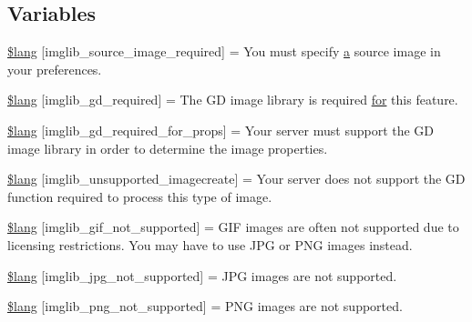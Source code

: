 \subsection*{Variables}
\begin{DoxyCompactItemize}
\item 
\hyperlink{system_2language_2english_2imglib__lang_8php_af48787ab142f633036ebdf1cc5da7409}{\$lang} \mbox{[}\textquotesingle{}imglib\+\_\+source\+\_\+image\+\_\+required\textquotesingle{}\mbox{]} = \textquotesingle{}You must specify \hyperlink{_admin_2assets_2js_2bootstrap_8min_8js_a1f5870dcf487187f13d5fd328ed9e6e7}{a} source image in your preferences.\textquotesingle{}
\item 
\hyperlink{system_2language_2english_2imglib__lang_8php_aa8d7f8276e62fbe759daef2021c16552}{\$lang} \mbox{[}\textquotesingle{}imglib\+\_\+gd\+\_\+required\textquotesingle{}\mbox{]} = \textquotesingle{}The G\+D image library is required \hyperlink{confirm__transfer_8php_aaf007b9fa5c90d7c5a7011bece9cfc15}{for} this feature.\textquotesingle{}
\item 
\hyperlink{system_2language_2english_2imglib__lang_8php_a0da9c99f9e2b5f38ccbefb9d9f702c5e}{\$lang} \mbox{[}\textquotesingle{}imglib\+\_\+gd\+\_\+required\+\_\+for\+\_\+props\textquotesingle{}\mbox{]} = \textquotesingle{}Your server must support the G\+D image library in order to determine the image properties.\textquotesingle{}
\item 
\hyperlink{system_2language_2english_2imglib__lang_8php_ace032cbe8dafb1f3417a758d0914ecdb}{\$lang} \mbox{[}\textquotesingle{}imglib\+\_\+unsupported\+\_\+imagecreate\textquotesingle{}\mbox{]} = \textquotesingle{}Your server does not support the G\+D function required to process this type of image.\textquotesingle{}
\item 
\hyperlink{system_2language_2english_2imglib__lang_8php_a235a59a6660145fc136b3933b5b10675}{\$lang} \mbox{[}\textquotesingle{}imglib\+\_\+gif\+\_\+not\+\_\+supported\textquotesingle{}\mbox{]} = \textquotesingle{}G\+I\+F images are often not supported due to licensing restrictions. You may have to use J\+P\+G or P\+N\+G images instead.\textquotesingle{}
\item 
\hyperlink{system_2language_2english_2imglib__lang_8php_a4acdc927c172bab1370b2897c667c552}{\$lang} \mbox{[}\textquotesingle{}imglib\+\_\+jpg\+\_\+not\+\_\+supported\textquotesingle{}\mbox{]} = \textquotesingle{}J\+P\+G images are not supported.\textquotesingle{}
\item 
\hyperlink{system_2language_2english_2imglib__lang_8php_a0b7ea2e2fbd03eb72fe9d969adb643dd}{\$lang} \mbox{[}\textquotesingle{}imglib\+\_\+png\+\_\+not\+\_\+supported\textquotesingle{}\mbox{]} = \textquotesingle{}P\+N\+G images are not supported.\textquotesingle{}

\end{DoxyCompactItemize}

